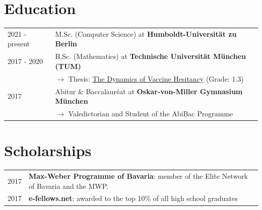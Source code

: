 \documentclass[a4paper,12pt]{article}
\begin{document}
\section{Education}
\begin{tabularx}{\linewidth}{@{}l X@{}}	
2021 - present & M.Sc. (Computer Science) at \textbf{Humboldt-Universität zu Berlin} \hfill \normalsize \\

2017 - 2020 & B.Sc. (Mathematics) at \textbf{Technische Universität München (TUM)}\hfill \\ 
&\phantom{ }$\rightarrow$ Thesis: \href{https://julienandco.github.io/the-dynamics-of-vaccine-hesitancy/bachelor_thesis_julien_caselmann.pdf}{The Dynamics of Vaccine Hesitancy} (Grade: 1.3) \\
2017 & Abitur \& Baccalauréat at \textbf{Oskar-von-Miller Gymnasium München} \hfill \\
&\phantom{ }$\rightarrow$ Valedictorian and Student of the AbiBac Programme
\end{tabularx}

\section{Scholarships}
\begin{tabularx}{\linewidth}{@{}l X@{}}
2017 &  \normalsize{\textbf{Max-Weber Programme of Bavaria}: member of the Elite Network of Bavaria and the MWP.}\\
2017 &  \normalsize{\textbf{e-fellows.net}: awarded to the top 10\% of all high school graduates}\\  
\end{tabularx}

\end{document}
